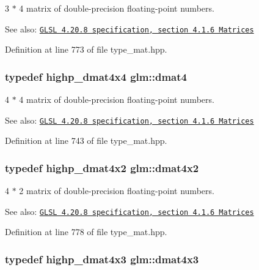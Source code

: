 3 $\ast$ 4 matrix of double-precision floating-point numbers.

\begin{Desc}
\item[See also:]\href{http://www.opengl.org/registry/doc/GLSLangSpec.4.20.8.pdf}{\tt GLSL 4.20.8 specification, section 4.1.6 Matrices} \end{Desc}


Definition at line 773 of file type\_\-mat.hpp.\hypertarget{group__core__types_g7f7c1300ebfd19d573e9deb1e8758b54}{
\subsubsection[dmat4]{\setlength{\rightskip}{0pt plus 5cm}typedef highp\_\-dmat4x4 {\bf glm::dmat4}}}
\label{group__core__types_g7f7c1300ebfd19d573e9deb1e8758b54}


4 $\ast$ 4 matrix of double-precision floating-point numbers.

\begin{Desc}
\item[See also:]\href{http://www.opengl.org/registry/doc/GLSLangSpec.4.20.8.pdf}{\tt GLSL 4.20.8 specification, section 4.1.6 Matrices} \end{Desc}


Definition at line 743 of file type\_\-mat.hpp.\hypertarget{group__core__types_gb3d51ce41e6f0aa267d3e185cee09c44}{
\subsubsection[dmat4x2]{\setlength{\rightskip}{0pt plus 5cm}typedef highp\_\-dmat4x2 {\bf glm::dmat4x2}}}
\label{group__core__types_gb3d51ce41e6f0aa267d3e185cee09c44}


4 $\ast$ 2 matrix of double-precision floating-point numbers.

\begin{Desc}
\item[See also:]\href{http://www.opengl.org/registry/doc/GLSLangSpec.4.20.8.pdf}{\tt GLSL 4.20.8 specification, section 4.1.6 Matrices} \end{Desc}


Definition at line 778 of file type\_\-mat.hpp.\hypertarget{group__core__types_ga4a157ac183c5bd5dcbd555a94b1b505}{
\subsubsection[dmat4x3]{\setlength{\rightskip}{0pt plus 5cm}typedef highp\_\-dmat4x3 {\bf glm::dmat4x3}}}
\label{group__core__types_ga4a157ac183c5bd5dcbd555a94b1b505}


